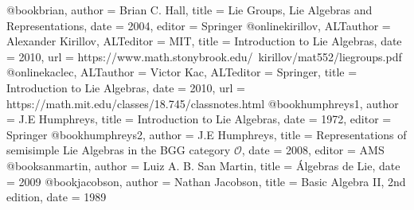 @book{brian,
author = {Brian C. Hall},
title = {Lie Groups, Lie Algebras and Representations},
date = {2004},
editor = {Springer}
}
@online{kirillov,
	ALTauthor = {Alexander Kirillov},
	ALTeditor = {MIT},
	title = {Introduction to Lie Algebras},
	date = {2010},
	url = {https://www.math.stonybrook.edu/~kirillov/mat552/liegroups.pdf}
}
@online{kaclec,
	ALTauthor = {Victor Kac},
	ALTeditor = {Springer},
	title = {Introduction to Lie Algebras},
	date = {2010},
	url = {https://math.mit.edu/classes/18.745/classnotes.html}
}
@book{humphreys1,
	author = {J.E Humphreys},
	title = {Introduction to Lie Algebras},
	date = {1972},
	editor = {Springer}
}
@book{humphreys2,
author = {J.E Humphreys},
title = {Representations of semisimple Lie Algebras in the BGG category $\mathcal{O}$},
date = {2008},
editor = {AMS}
}
@book{sanmartin,
author = {Luiz A. B. San Martin},
title = {Álgebras de Lie},
date = {2009}
}
@book{jacobson,
author = {Nathan Jacobson},
title = {Basic Algebra II, 2nd edition},
date = {1989}
}




